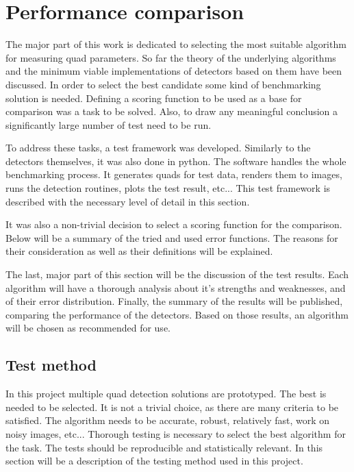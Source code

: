 \section{Performance comparison}

The major part of this work is dedicated to selecting the most suitable algorithm for measuring quad parameters.
So far the theory of the underlying algorithms and the minimum viable implementations of detectors based on them have been discussed.
In order to select the best candidate some kind of benchmarking solution is needed.
Defining a scoring function to be used as a base for comparison was a task to be solved.
Also, to draw any meaningful conclusion a significantly large number of test need to be run.

To address these tasks, a test framework was developed.
Similarly to the detectors themselves, it was also done in python.
The software handles the whole benchmarking process.
It generates quads for test data, renders them to images, runs the detection routines, plots the test result, etc...
This test framework is described with the necessary level of detail in this section.

It was also a non-trivial decision to select a scoring function for the comparison.
Below will be a summary of the tried and used error functions.
The reasons for their consideration as well as their definitions will be explained.

The last, major part of this section will be the discussion of the test results.
Each algorithm will have a thorough analysis about it's strengths and weaknesses, and of their error distribution.
Finally, the summary of the results will be published, comparing the performance of the detectors.
Based on those results, an algorithm will be chosen as recommended for use.

\subsection{Test method}

In this project multiple quad detection solutions are prototyped.
The best is needed to be selected.
It is not a trivial choice, as there are many criteria to be satisfied.
The algorithm needs to be accurate, robust, relatively fast, work on noisy images, etc...
Thorough testing is necessary to select the best algorithm for the task.
The tests should be reproducible and statistically relevant.
In this section will be a description of the testing method used in this project.

